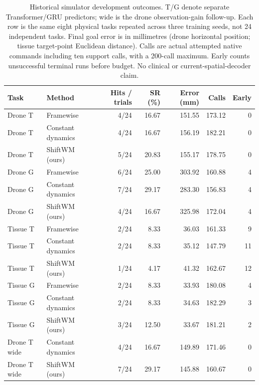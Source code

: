 \begin{table}[tbp]
\centering\fontsize{9}{10.5}\selectfont
\setlength{\tabcolsep}{3pt}
\begin{tabular}{llrrrrr}
\toprule
Task & Method & Hits / trials & SR (\%) & Error (mm) & Calls & Early \\
\midrule
Drone T & Framewise & 4/24 & 16.67 & 151.55 & 173.12 & 0 \\
Drone T & Constant dynamics & 4/24 & 16.67 & 156.19 & 182.21 & 0 \\
Drone T & ShiftWM (ours) & 5/24 & 20.83 & 155.17 & 178.75 & 0 \\
Drone G & Framewise & 6/24 & 25.00 & 303.92 & 160.88 & 4 \\
Drone G & Constant dynamics & 7/24 & 29.17 & 283.30 & 156.83 & 4 \\
Drone G & ShiftWM (ours) & 4/24 & 16.67 & 325.98 & 172.04 & 4 \\
Tissue T & Framewise & 2/24 & 8.33 & 36.03 & 161.33 & 9 \\
Tissue T & Constant dynamics & 2/24 & 8.33 & 35.12 & 147.79 & 11 \\
Tissue T & ShiftWM (ours) & 1/24 & 4.17 & 41.32 & 162.67 & 12 \\
Tissue G & Framewise & 2/24 & 8.33 & 33.93 & 180.08 & 4 \\
Tissue G & Constant dynamics & 2/24 & 8.33 & 34.63 & 182.29 & 3 \\
Tissue G & ShiftWM (ours) & 3/24 & 12.50 & 33.67 & 181.21 & 2 \\
Drone T wide & Constant dynamics & 4/24 & 16.67 & 149.89 & 171.46 & 0 \\
Drone T wide & ShiftWM (ours) & 7/24 & 29.17 & 145.88 & 160.67 & 0 \\
\bottomrule\end{tabular}
\caption{Historical simulator development outcomes. T/G denote separate Transformer/GRU predictors; wide is the drone observation-gain follow-up. Each row is the same eight physical tasks repeated across three training seeds, not 24 independent tasks. Final goal error is in millimetres (drone horizontal position; tissue target-point Euclidean distance). Calls are actual attempted native commands including ten support calls, with a 200-call maximum. Early counts unsuccessful terminal runs before budget. No clinical or current-spatial-decoder claim.}
\label{tab:physical-extensions}
\end{table}

